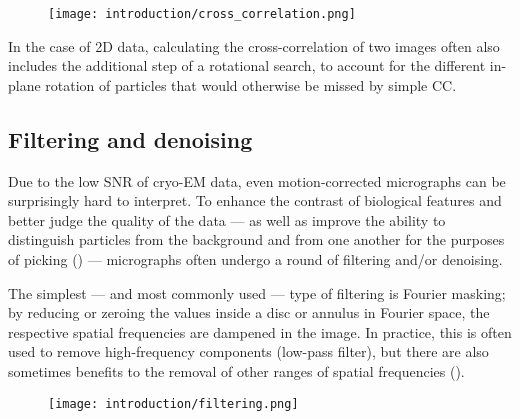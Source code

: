\begin{figure}
    \centering
    \texttt{[image: introduction/cross\_correlation.png]}
    \label{fig:em_cross_correlation}
\end{figure}

In the case of 2D data, calculating the cross-correlation of two images often also includes the additional step of a rotational search, to account for the different in-plane rotation of particles that would otherwise be missed by simple CC.

\subsection{Filtering and denoising}\label{em_filtering_and_denoising}

Due to the low SNR of cryo-EM data, even motion-corrected micrographs can be surprisingly hard to interpret.
To enhance the contrast of biological features and better judge the quality of the data --- as well as improve the ability to distinguish particles from the background and from one another for the purposes of picking () --- micrographs often undergo a round of filtering and/or denoising.

The simplest --- and most commonly used --- type of filtering is Fourier masking; by reducing or zeroing the values inside a disc or annulus in Fourier space, the respective spatial frequencies are dampened in the image.
In practice, this is often used to remove high-frequency components (low-pass filter), but there are also sometimes benefits to the removal of other ranges of spatial frequencies ().

\begin{figure}[!ht]
    \centering
    \texttt{[image: introduction/filtering.png]}
    \label{fig:em_filtering}
\end{figure}

